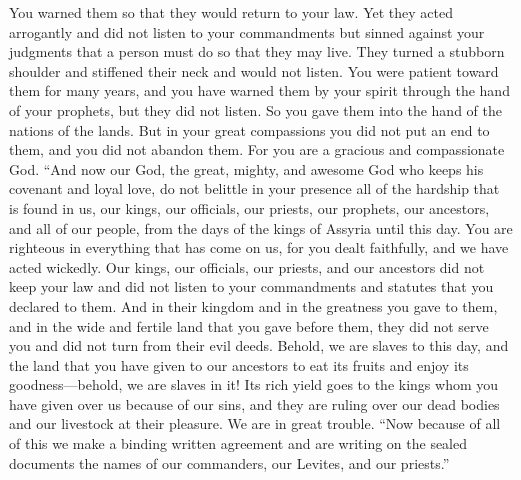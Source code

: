 \begin{biblechapter}
\verse You warned them so that they would return to your law. Yet they acted arrogantly and did not listen to your commandments but sinned against your judgments that a person must do so that they may live. They turned a stubborn shoulder and stiffened their neck and would not listen.
\verse You were patient toward them for many years, and you have warned them by your spirit through the hand of your prophets, but they did not listen. So you gave them into the hand of the nations of the lands.
\verse But in your great compassions you did not put an end to them, and you did not abandon them. For you are a gracious and compassionate God.
\verse “And now our God, the great, mighty, and awesome God who keeps his covenant and loyal love, do not belittle in your presence all of the hardship that is found in us, our kings, our officials, our priests, our prophets, our ancestors, and all of our people, from the days of the kings of Assyria until this day.
\verse You are righteous in everything that has come on us, for you dealt faithfully, and we have acted wickedly.
\verse Our kings, our officials, our priests, and our ancestors did not keep your law and did not listen to your commandments and statutes that you declared to them.
\verse And in their kingdom and in the greatness you gave to them, and in the wide and fertile land that you gave before them, they did not serve you and did not turn from their evil deeds.
\verse Behold, we are slaves to this day, and the land that you have given to our ancestors to eat its fruits and enjoy its goodness—behold, we are slaves in it!
\verse Its rich yield goes to the kings whom you have given over us because of our sins, and they are ruling over our dead bodies and our livestock at their pleasure. We are in great trouble.
\verse  “Now because of all of this we make a binding written agreement and are writing on the sealed documents the names of our commanders, our Levites, and our priests.”
\end{biblechapter}

